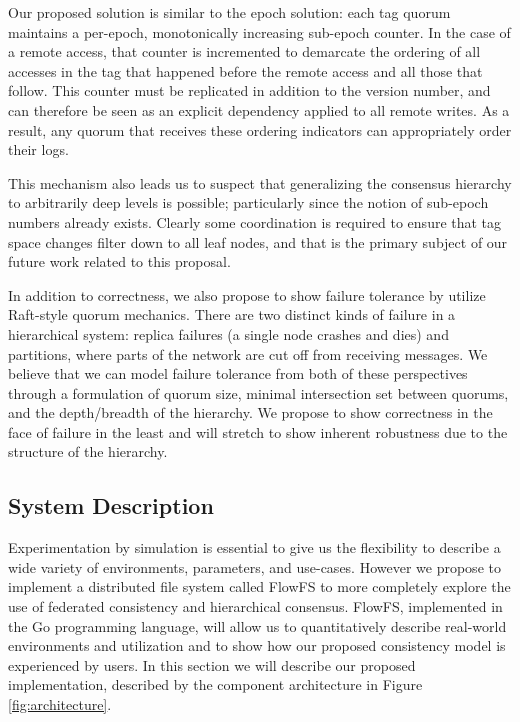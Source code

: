 \documentclass{article}
\begin{document}
Our proposed solution is similar to the epoch solution: each tag quorum maintains a per-epoch, monotonically increasing sub-epoch counter. In the case of a remote access, that counter is incremented to demarcate the ordering of all accesses in the tag that happened before the remote access and all those that follow. This counter must be replicated in addition to the version number, and can therefore be seen as an explicit dependency applied to all remote writes. As a result, any quorum that receives these ordering indicators can appropriately order their logs.

This mechanism also leads us to suspect that generalizing the consensus hierarchy to arbitrarily deep levels is possible; particularly since the notion of sub-epoch numbers already exists. Clearly some coordination is required to ensure that tag space changes filter down to all leaf nodes, and that is the primary subject of our future work related to this proposal.

In addition to correctness, we also propose to show failure tolerance by utilize Raft-style quorum mechanics. There are two distinct kinds of failure in a hierarchical system: replica failures (a single node crashes and dies) and partitions, where parts of the network are cut off from receiving messages. We believe that we can model failure tolerance from both of these perspectives through a formulation of quorum size, minimal intersection set between quorums, and the depth/breadth of the hierarchy. We propose to show correctness in the face of failure in the least and will stretch to show inherent robustness due to the structure of the hierarchy.

\subsection{System Description}
\label{sec:system}

Experimentation by simulation is essential to give us the flexibility to describe a wide variety of environments, parameters, and use-cases. However we propose to implement a distributed file system called FlowFS to more completely explore the use of federated consistency and hierarchical consensus. FlowFS, implemented in the Go programming language, will allow us to quantitatively describe real-world environments and utilization and to show how our proposed consistency model is experienced by users. In this section we will describe our proposed implementation, described by the component architecture in Figure \ref{fig:architecture}.
\end{document}

